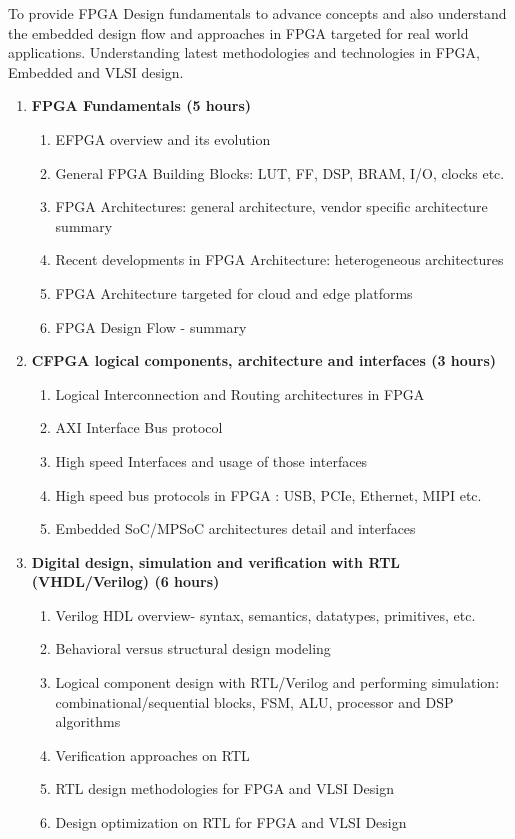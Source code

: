
\cobjectives
  To provide FPGA Design fundamentals to advance concepts and also understand the embedded design flow and approaches in FPGA targeted for real world applications. Understanding latest methodologies and technologies in FPGA, Embedded and VLSI
  design.
  \VS

\begin{enumerate}
  \item \textbf{FPGA Fundamentals \hfill (5 hours)}
    \begin{enumerate}
      \item EFPGA overview and its evolution
      \item General FPGA Building Blocks: LUT, FF, DSP, BRAM, I/O, clocks etc.
      \item FPGA Architectures: general architecture, vendor specific architecture summary
      \item Recent developments in FPGA Architecture: heterogeneous architectures
      \item FPGA Architecture targeted for cloud and edge platforms
      \item FPGA Design Flow - summary
    \end{enumerate}
    \vs

  \item \textbf{CFPGA logical components, architecture and interfaces \hfill (3 hours)}
    \begin{enumerate}
      \item Logical Interconnection and Routing architectures in FPGA
      \item AXI Interface Bus protocol
      \item High speed Interfaces and usage of those interfaces
      \item  High speed bus protocols in FPGA : USB, PCIe, Ethernet, MIPI etc.
      \item Embedded SoC/MPSoC architectures detail and interfaces
    \end{enumerate}
    \vs

  \item \textbf{Digital design, simulation and verification with RTL (VHDL/Verilog) (6 hours)}
    \begin{enumerate}
      \item Verilog HDL overview- syntax, semantics, datatypes, primitives, etc.
      \item Behavioral versus structural design modeling
      \item Logical component design with RTL/Verilog and performing simulation: combinational/sequential blocks, FSM, ALU, processor and DSP algorithms
      \item Verification approaches on RTL
      \item RTL design methodologies for FPGA and VLSI Design
      \item Design optimization on RTL for FPGA and VLSI Design
    \end{enumerate}
    \vs


\end{enumerate}
